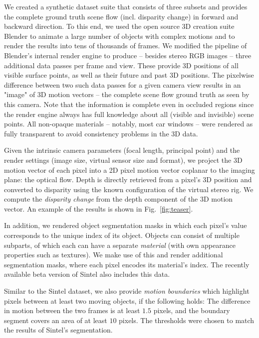 \documentclass[10pt,twocolumn,letterpaper]{article}
\begin{document}
We created a synthetic dataset suite that consists of three subsets and provides the complete ground truth scene flow (incl. disparity change) in forward and backward direction.  
To this end, we used the open source 3D creation suite Blender to animate a large number of objects with complex motions and to render the results into tens of thousands of frames.
We modified the pipeline of Blender's internal render engine to produce -- besides stereo RGB images -- three additional data passes per frame and view. 
These provide 3D positions of all visible surface points, as well as their future and past 3D positions. The pixelwise difference between two such data passes for a given camera view results in an "image" of 3D motion vectors -- the complete scene flow ground truth as seen by this camera. 
Note that the information is complete even in occluded regions since the render engine always has full knowledge about all (visible and invisible) scene points.
All non-opaque materials -- notably, most car windows -- were rendered as fully transparent to avoid consistency problems in the 3D data.

Given the intrinsic camera parameters (focal length, principal point) and the render settings (image size, virtual sensor size and format), we project the 3D motion vector of each pixel into a 2D pixel motion vector coplanar to the imaging plane: 
the optical flow. 
Depth is directly retrieved from a pixel's 3D position and converted to disparity using the known configuration of the virtual stereo rig.
We compute the \emph{disparity change} from the depth component of the 3D motion vector.
An example of the results is shown in Fig.~\ref{fig:teaser}.

In addition, we rendered object segmentation masks in which each pixel's value corresponds to the unique index of its object. 
Objects can consist of multiple subparts, of which each can have a separate \emph{material} (with own appearance properties such as textures). We make use of this and render additional segmentation masks, where each pixel encodes its material's index.
The recently available beta version of Sintel also includes this data.


Similar to the Sintel dataset, we also provide \emph{motion boundaries} which highlight pixels between at least two moving objects, if the following holds: 
The difference in motion between the two frames is at least $1.5$ pixels, and the boundary segment covers an area of at least $10$ pixels.
The thresholds were chosen to match the results of Sintel's segmentation.
\end{document}
